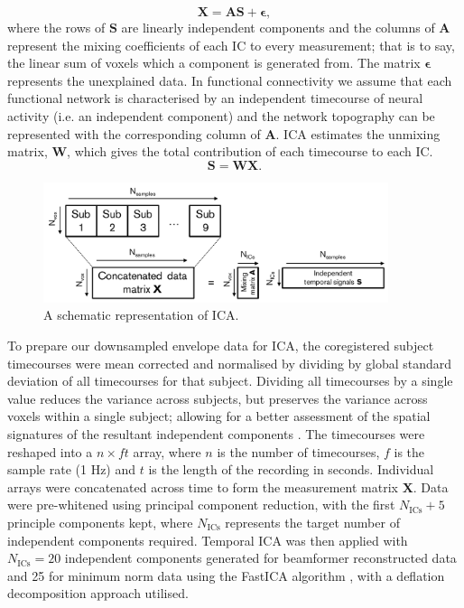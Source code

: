 \begin{equation}
\mathbf{X} = \mathbf{AS}+\mathbf{\epsilon},\label{eqn_ica}
\end{equation} where the rows of $\mathbf{S}$ are linearly independent components and the columns of \textbf{A} represent the mixing coefficients of each IC to every measurement; that is to say, the linear sum of voxels which a component is generated from. The matrix $\mathbf{\epsilon}$ represents the unexplained data. In functional connectivity we assume that each functional network is characterised by an independent timecourse of neural activity (i.e. an independent component) and the network topography can be represented with the corresponding column of \textbf{A}. ICA estimates the unmixing matrix, \textbf{W}, which gives the total contribution of each timecourse to each IC. 
\begin{equation}
\mathbf{S} = \mathbf{WX}.
\end{equation}

\begin{figure}[h!]
	\begin{centering}
		\includegraphics[width=0.9\textwidth]{./images/chapter2/ica.pdf}
		\caption{A schematic representation of ICA.}
		\label{fig_bf_mn_ic}
	\end{centering}
\end{figure}

To prepare our downsampled envelope data for ICA, the coregistered subject timecourses were mean corrected and normalised by dividing by global standard deviation of all timecourses for that subject. Dividing all timecourses by a single value reduces the variance across subjects, but preserves the variance across voxels within a single subject;  allowing for a better assessment of the spatial signatures of the resultant independent components \citep{Hall2013}. The timecourses were reshaped into a $n\times ft$ array, where $n$ is the number of timecourses, $f$ is the sample rate (1 Hz) and $t$ is the length of the recording in seconds. Individual arrays were concatenated across time to form the measurement matrix \textbf{X}. Data were pre-whitened using principal component reduction, with the first $N_{\text{ICs}}+5$ principle components kept, where $N_{\text{ICs}}$ represents the target number of independent components required. Temporal ICA was then applied with $N_{\text{ICs}}=20$ independent components  generated for beamformer reconstructed data and 25 for minimum norm data using the FastICA algorithm \citep{Hyvarinen1999}, with a deflation decomposition approach utilised. 


